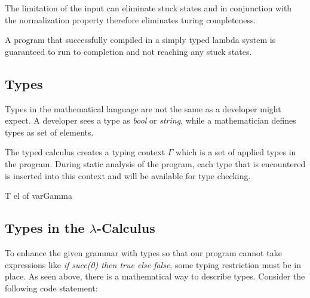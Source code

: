 


The limitation of the input can eliminate stuck states
and in conjunction with the normalization property \cite{pierce2002ProgLang} \cite{baader_nipkow_1998}
therefore eliminates turing completeness.

A program that successfully compiled in a simply typed
lambda system is guaranteed to run to completion and not
reaching any stuck states.

\subsection{Types}

Types in the mathematical language are not the same as a developer
might expect. A developer sees a type as \textit{bool} or \textit{string},
while a mathematician defines types as set of elements.

The typed calculus creates a typing context $\varGamma$ which is a
set of applied types in the program. During static analysis of the program, each
type that is encountered is inserted into this context and will be available
for type checking.

T el of varGamma


\subsection{Types in the $\lambda$-Calculus}

To enhance the given grammar with types so that our program
cannot take expressions like \textit{if succ(0) then true else false},
some typing restriction must be in place. As seen above, there is a
mathematical way to describe types. Consider the following code statement:


